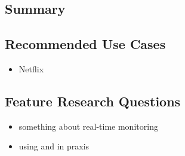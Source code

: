 \subsection{Summary}

\subsection{Recommended Use Cases}
\begin{itemize}
  \item Netflix
\end{itemize}


\subsection{Feature Research Questions}
\begin{itemize}
  \item something about real-time monitoring
  \item using \chuk and \amb in praxis
\end{itemize}